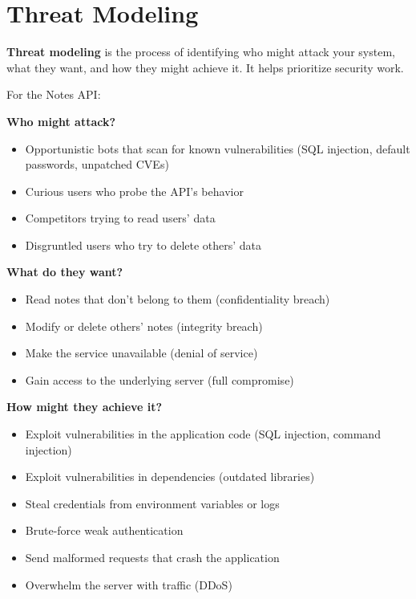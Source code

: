 \section{Threat Modeling}\label{38-security:381-threat-modeling}

\textbf{Threat modeling} is the process of identifying who might attack your system, what they want, and how they might achieve it. It helps prioritize security work.

For the Notes API:

\textbf{Who might attack?}

\begin{itemize}
\tightlist
\item
  Opportunistic bots that scan for known vulnerabilities (SQL injection, default passwords, unpatched CVEs)
\item
  Curious users who probe the API's behavior
\item
  Competitors trying to read users' data
\item
  Disgruntled users who try to delete others' data
\end{itemize}

\noindent{}\textbf{What do they want?}

\begin{itemize}
\tightlist
\item
  Read notes that don't belong to them (confidentiality breach)
\item
  Modify or delete others' notes (integrity breach)
\item
  Make the service unavailable (denial of service)
\item
  Gain access to the underlying server (full compromise)
\end{itemize}

\noindent{}\textbf{How might they achieve it?}

\begin{itemize}
\tightlist
\item
  Exploit vulnerabilities in the application code (SQL injection, command injection)
\item
  Exploit vulnerabilities in dependencies (outdated libraries)
\item
  Steal credentials from environment variables or logs
\item
  Brute-force weak authentication
\item
  Send malformed requests that crash the application
\item
  Overwhelm the server with traffic (DDoS)
\end{itemize}

